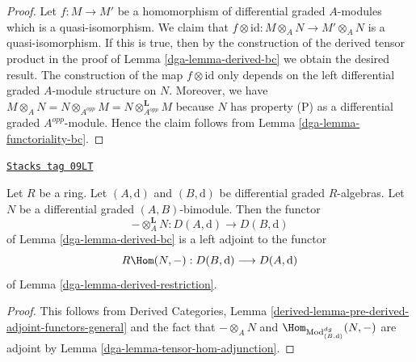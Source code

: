 \begin{proof}

Let $f : M \to M'$ be a homomorphism of differential graded $A$-modules
which is a quasi-isomorphism. We claim that $f \otimes \text{id} :
M \otimes_A N \to M' \otimes_A N$ is a quasi-isomorphism. If this
is true, then by the construction of the derived tensor product
in the proof of Lemma \ref{dga-lemma-derived-bc} we obtain the desired result.
The construction of the map $f \otimes \text{id}$ only depends
on the left differential graded $A$-module structure on $N$.
Moreover, we have $M \otimes_A N = N \otimes_{A^{opp}} M =
N \otimes_{A^{opp}}^\mathbf{L} M$ because $N$ has property (P) as
a differential graded $A^{opp}$-module. Hence the claim follows
from Lemma \ref{dga-lemma-functoriality-bc}.
\end{proof}

\begin{lemma}
\label{dga-lemma-tensor-hom-adjoint}
\href{https://stacks.math.columbia.edu/tag/09LT}{\texttt{Stacks tag 09LT}}

Let $R$ be a ring.
Let $(A, \text{d})$ and $(B, \text{d})$ be differential graded $R$-algebras.
Let $N$ be a differential graded $(A, B)$-bimodule.
Then the functor
$$
- \otimes_A^\mathbf{L} N : D(A, \text{d}) \longrightarrow D(B, \text{d})
$$
of Lemma \ref{dga-lemma-derived-bc} is a left adjoint to the functor
$$
R\Hom(N, -) : D(B, \text{d}) \longrightarrow D(A, \text{d})
$$
of Lemma \ref{dga-lemma-derived-restriction}.
\end{lemma}

\begin{proof}

This follows from Derived Categories, Lemma
\ref{derived-lemma-pre-derived-adjoint-functors-general}
and the fact that $- \otimes_A N$ and
$\Hom_{\text{Mod}^{dg}_{(B, \text{d})}}(N, -)$ are adjoint by
Lemma \ref{dga-lemma-tensor-hom-adjunction}.
\end{proof}


